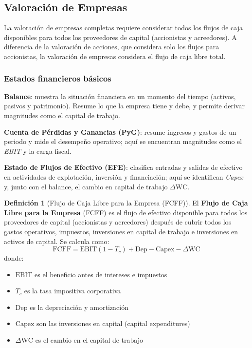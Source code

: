 \documentclass[12pt,a4paper]{article}
\theoremstyle{definition}
\newtheorem{definicion}{Definición}[section]
\begin{document}
\subsection{Valoración de Empresas}

La valoración de empresas completas requiere considerar todos los flujos de caja disponibles para todos los proveedores de capital (accionistas y acreedores). A diferencia de la valoración de acciones, que considera solo los flujos para accionistas, la valoración de empresas considera el flujo de caja libre total.

\subsubsection{Estados financieros básicos}
\textbf{Balance}: muestra la situación financiera en un momento del tiempo (activos, pasivos y patrimonio). Resume lo que la empresa tiene y debe, y permite derivar magnitudes como el capital de trabajo.

\textbf{Cuenta de Pérdidas y Ganancias (PyG)}: resume ingresos y gastos de un periodo y mide el desempeño operativo; aquí se encuentran magnitudes como el \textit{EBIT} y la carga fiscal.

\textbf{Estado de Flujos de Efectivo (EFE)}: clasifica entradas y salidas de efectivo en actividades de explotación, inversión y financiación; aquí se identifican \textit{Capex} y, junto con el balance, el cambio en capital de trabajo $\Delta \text{WC}$.

\begin{definicion}[Flujo de Caja Libre para la Empresa (FCFF)]
El \textbf{Flujo de Caja Libre para la Empresa} (FCFF) es el flujo de efectivo disponible para todos los proveedores de capital (accionistas y acreedores) después de cubrir todos los gastos operativos, impuestos, inversiones en capital de trabajo e inversiones en activos de capital. Se calcula como:
\begin{equation}
\text{FCFF} = \text{EBIT}(1 - T_c) + \text{Dep} - \text{Capex} - \Delta \text{WC}
\end{equation}
donde:
\begin{itemize}
\item $\text{EBIT}$ es el beneficio antes de intereses e impuestos
\item $T_c$ es la tasa impositiva corporativa
\item $\text{Dep}$ es la depreciación y amortización
\item $\text{Capex}$ son las inversiones en capital (capital expenditures)
\item $\Delta \text{WC}$ es el cambio en el capital de trabajo
\end{itemize}
\end{definicion}
\end{document}
